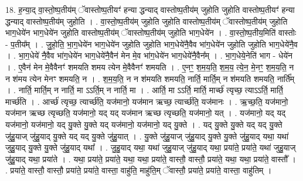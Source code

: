 \documentclass[17pt]{extarticle}
\begin{document}
18. ह॒न्या॒द् वा॒स्तो॒ष्प॒तीय॑म् ॅवास्तोष्प॒तीयꣳ॑ हन्या द्धन्याद् वास्तोष्प॒तीय॑म् जुहोति जुहोति वास्तोष्प॒तीयꣳ॑ हन्या द्धन्याद् वास्तोष्प॒तीय॑म् जुहोति । . वा॒स्तो॒ष्प॒तीय॑म् जुहोति जुहोति वास्तोष्प॒तीय॑म् ॅवास्तोष्प॒तीय॑म् जुहोति भाग॒धेये॑न भाग॒धेये॑न जुहोति वास्तोष्प॒तीय॑म् ॅवास्तोष्प॒तीय॑म् जुहोति भाग॒धेये॑न । . वा॒स्तो॒ष्प॒तीय॒मिति॑ वास्तोः - प॒तीय᳚म् । . जु॒हो॒ति॒ भा॒ग॒धेये॑न भाग॒धेये॑न जुहोति जुहोति भाग॒धेये॑नै॒वैव भा॑ग॒धेये॑न जुहोति जुहोति भाग॒धेये॑नै॒व । . भा॒ग॒धेये॑ नै॒वैव भा॑ग॒धेये॑न भाग॒धेये॑नै॒वैन॑ मेन मे॒व भा॑ग॒धेये॑न भाग॒धेये॑नै॒वैन᳚म् । . भा॒ग॒धेये॒नेति॑ भाग - धेये॑न । . ए॒वैन॑ मेन मे॒वैवैनꣳ॑ शमयति शमय त्येन मे॒वैवैनꣳ॑ शमयति । . ए॒नꣳ॒॒ श॒म॒य॒ति॒ श॒म॒य॒ त्ये॒न॒ मे॒नꣳ॒॒ श॒म॒य॒ति॒ न न श॑मय त्येन मेनꣳ शमयति॒ न । . श॒म॒य॒ति॒ न न श॑मयति शमयति॒ नार्ति॒ मार्ति॒म् न श॑मयति शमयति॒ नार्ति᳚म् । . नार्ति॒ मार्ति॒म् न नार्ति॒ मा ऽऽर्ति॒म् न नार्ति॒ मा । . आर्ति॒ मा ऽऽर्ति॒ मार्ति॒ मार्च्छ॑ त्यृच्छ॒ त्याऽऽर्ति॒ मार्ति॒ मार्च्छ॑ति । . आर्च्छ॑ त्यृच्छ॒ त्यार्च्छ॑ति॒ यज॑मानो॒ यज॑मान ऋच्छ॒ त्यार्च्छ॑ति॒ यज॑मानः । . ऋ॒च्छ॒ति॒ यज॑मानो॒ यज॑मान ऋच्छ त्यृच्छति॒ यज॑मानो॒ यद् यद् यज॑मान ऋच्छ त्यृच्छति॒ यज॑मानो॒ यत् । . यज॑मानो॒ यद् यद् यज॑मानो॒ यज॑मानो॒ यद् यु॒क्ते यु॒क्ते यद् यज॑मानो॒ यज॑मानो॒ यद् यु॒क्ते । . यद् यु॒क्ते यु॒क्ते यद् यद् यु॒क्ते जु॑हु॒याज् जु॑हु॒याद् यु॒क्ते यद् यद् यु॒क्ते जु॑हु॒यात् । . यु॒क्ते जु॑हु॒याज् जु॑हु॒याद् यु॒क्ते यु॒क्ते जु॑हु॒याद् यथा॒ यथा॑ जुहु॒याद् यु॒क्ते यु॒क्ते जु॑हु॒याद् यथा᳚ । . जु॒हु॒याद् यथा॒ यथा॑ जुहु॒याज् जु॑हु॒याद् यथा॒ प्रया॑ते॒ प्रया॑ते॒ यथा॑ जुहु॒याज् जु॑हु॒याद् यथा॒ प्रया॑ते । . यथा॒ प्रया॑ते॒ प्रया॑ते॒ यथा॒ यथा॒ प्रया॑ते॒ वास्तौ॒ वास्तौ॒ प्रया॑ते॒ यथा॒ यथा॒ प्रया॑ते॒ वास्तौ᳚ । . प्रया॑ते॒ वास्तौ॒ वास्तौ॒ प्रया॑ते॒ प्रया॑ते॒ वास्ता॒ वाहु॑ति॒ माहु॑ति॒म् ॅवास्तौ॒ प्रया॑ते॒ प्रया॑ते॒ वास्ता॒ वाहु॑तिम् । \newline
\end{document}
